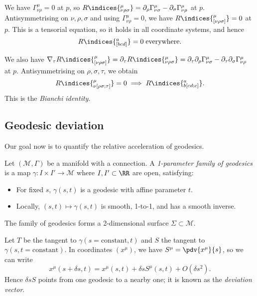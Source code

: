 \documentclass{jknotes}
\begin{document}
We have \(\Gamma^\mu_{\nu\rho} = 0\) at \(p\), so \(R\indices{^\mu_{\nu\rho\sigma}}=\partial_\rho\Gamma^\mu_{\nu\sigma} - \partial_\sigma\Gamma^\mu_{\nu\rho}\) at \(p\). Antisymmetrising on \(\nu,\rho,\sigma\) and using \(\Gamma^\mu_{\nu\rho}=0\), we have \(R\indices{^\mu_{[\nu\rho\sigma]}} = 0\) at \(p\). This is a tensorial equation, so it holds in all coordinate systems, and hence
\begin{equation}
    R\indices{^a_{[bcd]}} = 0 \;\text{everywhere}.
\end{equation}

We also have \(\nabla_\tau R\indices{^\mu_{[\nu\rho\sigma]}} = \partial_\tau R\indices{^\mu_{\nu\rho\sigma}} = \partial_\tau\partial_\rho\Gamma^\mu_{\nu\sigma} - \partial_\tau\partial_\sigma\Gamma^\mu_{\nu\rho}\) at \(p\). Antisymmetrising on \(\rho,\sigma,\tau\), we obtain
\begin{equation}
    R\indices{^\mu_{\nu[\rho\sigma;\tau]}} = 0 \implies R\indices{^a_{b[cd;e]}}.
\end{equation}
This is the \emph{Bianchi identity}.

\subsection{Geodesic deviation}
Our goal now is to quantify the relative acceleration of geodesics.

\begin{defn}
    Let \((\mathcal{M},\Gamma)\) be a manifold with a connection. A \emph{1-parameter family of geodesics} is a map \(\gamma:I\times I'\to\mathcal{M}\) where \(I,I'\subset\RR\) are open, satisfying:
    \begin{itemize}
        \item For fixed \(s\), \(\gamma(s,t)\) is a geodesic with affine parameter \(t\).
        \item Locally, \((s,t)\mapsto\gamma(s,t)\) is smooth, 1-to-1, and has a smooth inverse.
    \end{itemize}
    The family of geodesics forms a 2-dimensional surface \(\Sigma \subset \mathcal{M}\).
\end{defn}

Let \(T\) be the tangent to \(\gamma(s=\text{constant},t)\) and \(S\) the tangent to \(\gamma(s,t=\text{constant})\). In coordinates \((x^\mu)\), we have \(S^\mu = \pdv{x^\mu}{s}\), so we can write
\begin{equation}
    x^\mu(s+\delta s,t) = x^\mu(s,t) + \delta s S^\mu(s,t) + O(\delta s^2).
\end{equation}
Hence \(\delta s S\) points from one geodesic to a nearby one; it is known as the \emph{deviation vector}.
\end{document}
